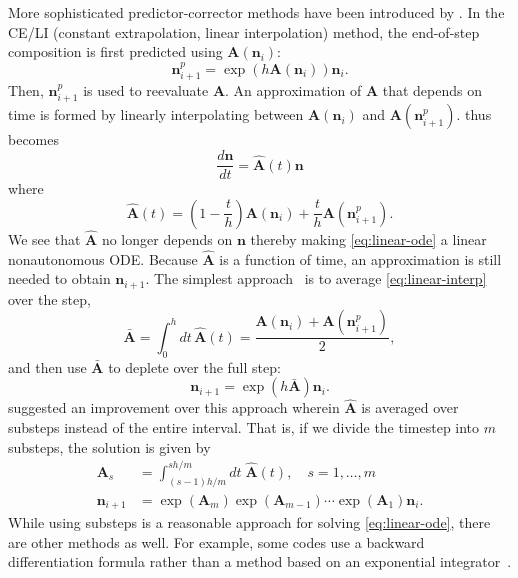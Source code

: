 \documentclass[3p,authoryear]{elsarticle}
\newcommand{\vect}[1]{\mathbf{#1}} %
\begin{document}
More sophisticated predictor-corrector methods have been introduced by
\citet{isotalo2011ane2,isotalo2011ane3}. In the CE/LI (constant extrapolation,
linear interpolation) method, the end-of-step composition is first predicted
using $\vect{A}(\vect{n}_i)$:
\begin{equation}
  \vect{n}_{i+1}^p = \exp \left( h\vect{A}(\vect{n}_i) \right) \vect{n}_i.
\end{equation}
Then, $\vect{n}_{i+1}^p$ is used to reevaluate $\vect{A}$. An approximation of
$\vect{A}$ that depends on time is formed by linearly interpolating between
$\vect{A}(\vect{n}_i)$ and $\vect{A}\left(\vect{n}_{i+1}^p\right)$.
 thus becomes
\begin{equation}
  \label{eq:linear-ode}
  \frac{d\vect{n}}{dt} = \hat{\vect{A}}(t) \vect{n}
\end{equation}
where
\begin{equation}
  \label{eq:linear-interp}
  \hat{\vect{A}}(t) = \left ( 1 - \frac{t}{h} \right) \vect{A}(\vect{n}_i) +
  \frac{t}{h} \vect{A}\left(\vect{n}_{i+1}^p \right).
\end{equation}
We see that $\hat{\vect{A}}$ no longer depends on $\vect{n}$ thereby making
\cref{eq:linear-ode} a linear nonautonomous ODE. Because $\hat{\vect{A}}$ is a
function of time, an approximation is still needed to obtain $\vect{n}_{i+1}$.
The simplest approach~\citep{isotalo2011ane2} is to average
\cref{eq:linear-interp} over the step,
\begin{equation}
  \bar{\vect{A}} = \int_0^h dt \, \hat{\vect{A}}(t) = \frac{\vect{A}(\vect{n}_i)
  + \vect{A}(\vect{n}_{i+1}^p)}{2},
\end{equation}
and then use $\bar{\vect{A}}$ to deplete over the full step:
\begin{equation}
  \vect{n}_{i+1} = \exp \left ( h \bar{\vect{A}} \right ) \vect{n}_i.
\end{equation}
\citet{isotalo2011ane3} suggested an improvement over this approach wherein
$\hat{\vect{A}}$ is averaged over substeps instead of the entire interval. That
is, if we divide the timestep into $m$ substeps, the solution is given by
\begin{equation}
  \begin{split}
    \label{eq:celi-substeps}
    \vect{A}_s &= \int_{(s-1)h/m}^{sh/m} dt \; \hat{\vect{A}}(t), \quad s=1,\dots,m \\
    \vect{n}_{i+1} &= \exp\left(\vect{A}_m \right) \exp \left(\vect{A}_{m-1}\right)
    \cdots \exp\left(\vect{A}_1\right) \vect{n}_i.
  \end{split}
\end{equation}
While using substeps is a reasonable approach for solving
\cref{eq:linear-ode}, there are other methods as well. For example, some
codes use a backward differentiation formula rather than a method based on an
exponential integrator~\cite{carpenter2009mc,hykes2017mc,sublet2017nds}.
\end{document}

